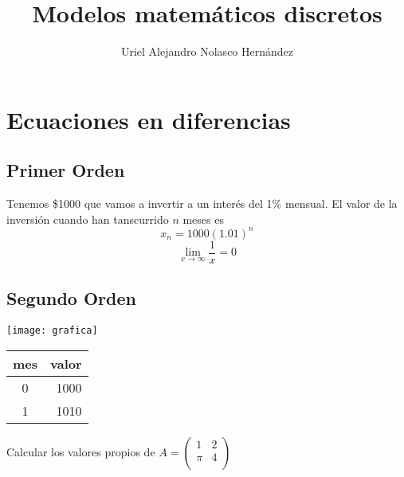 \documentclass{article}
\title{Modelos matemáticos discretos}
\author{Uriel Alejandro Nolasco Hernández}
\begin{document}
	\maketitle
	\section{Ecuaciones en diferencias}

	\subsection{Primer Orden}
	Tenemos \$1000 que vamos a invertir a un interés del 1\% mensual.
El valor de la inversión cuando han tanscurrido $n$ meses es $$x_n=1000(1.01)^n$$
$$\lim_{x\to\infty}\frac{1}{x}=0$$
	
	\subsection{Segundo Orden}
\begin{center}
\texttt{[image: grafica]}	
\end{center}
\begin{center}
	\begin{tabular}{|c|r|}
\hline
mes & valor\\
\hline
\hline
0 & 1000\\
1 & 1010\\
\hline
	\end{tabular}
	
\end{center}
Calcular los valores propios de $A=(
\begin{matrix}
1 & 2\\
\pi & 4\\ 
\end {matrix}
)
$
\end{document}
